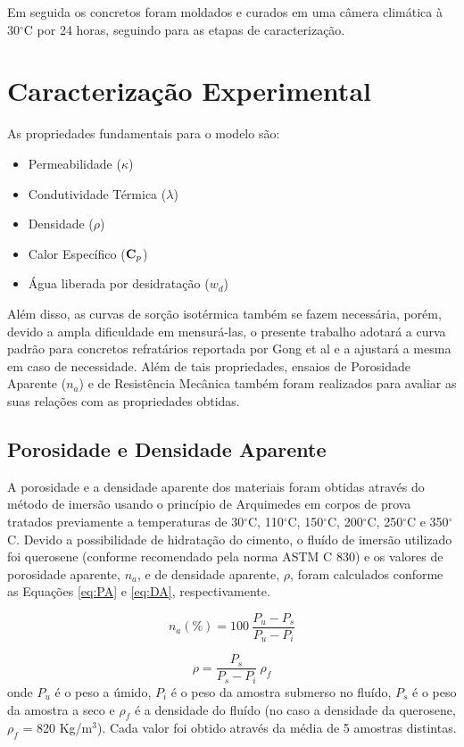 Em seguida os concretos foram moldados e curados em uma câmera climática à
30$^{\circ}$C por 24 horas, seguindo para as etapas de caracterização.

\section{Caracterização Experimental}\label{mat:exp}
As propriedades fundamentais para o modelo são:

\begin{itemize}
\item Permeabilidade ($\kappa$)
\item Condutividade Térmica ($\lambda$)
\item Densidade ($\rho$)
\item Calor Específico ($\bm{\mathrm{C}}_p$)
\item Água liberada por desidratação ($w_d$)
\end{itemize}

Além disso, as curvas de sorção isotérmica também se fazem necessária, porém,
devido a ampla dificuldade em mensurá-las, o presente trabalho adotará a curva
padrão para concretos refratários reportada por Gong et al\cite{Gong1995a} e a
ajustará a mesma em caso de necessidade. Além de tais propriedades, ensaios de
Porosidade Aparente ($n_a$) e de Resistência Mecânica também foram realizados
para avaliar as suas relações com as propriedades obtidas.

\subsection{Porosidade e Densidade Aparente}\label{mat:porosidade}
A porosidade e a densidade aparente dos materiais foram obtidas através do
método de imersão usando o princípio de Arquimedes em corpos de prova tratados
previamente a temperaturas de 30$^\circ$C, 110$^\circ$C, 150$^\circ$C,
200$^\circ$C, 250$^\circ$C e 350$^\circ$C. Devido a possibilidade de hidratação
do cimento, o fluído de imersão utilizado foi querosene (conforme recomendado
pela norma ASTM C 830) e os valores de porosidade aparente, $n_a$, e de densidade
aparente, $\rho$, foram calculados conforme as Equações \ref{eq:PA} e
\ref{eq:DA}, respectivamente.

\begin{equation}
  \label{eq:PA}
  n_a (\%)= 100 \ \frac{P_u-P_s}{P_u-P_i}
\end{equation}

\begin{equation}
  \label{eq:DA}
  \rho = \frac{P_s}{P_s - P_i} \ \rho_f
\end{equation}
onde $P_u$ é o peso a úmido, $P_i$ é o peso da amostra submerso no fluído, $P_s$
é o peso da amostra a seco e $\rho_f$ é a densidade do fluído (no caso a
densidade da querosene, $\rho_f$ = 820 Kg/m$^3$). Cada valor foi obtido através
da média de 5 amostras distintas.
    
